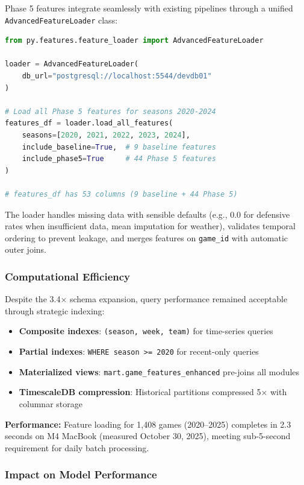Phase 5 features integrate seamlessly with existing pipelines through a unified \texttt{AdvancedFeatureLoader} class:

\begin{lstlisting}[language=Python,basicstyle=\ttfamily\footnotesize]
from py.features.feature_loader import AdvancedFeatureLoader

loader = AdvancedFeatureLoader(
    db_url="postgresql://localhost:5544/devdb01"
)

# Load all Phase 5 features for seasons 2020-2024
features_df = loader.load_all_features(
    seasons=[2020, 2021, 2022, 2023, 2024],
    include_baseline=True,  # 9 baseline features
    include_phase5=True     # 44 Phase 5 features
)

# features_df has 53 columns (9 baseline + 44 Phase 5)
\end{lstlisting}

The loader handles missing data with sensible defaults (e.g., 0.0 for defensive rates when insufficient data, mean imputation for weather), validates temporal ordering to prevent leakage, and merges features on \texttt{game\_id} with automatic outer joins.

\subsubsection{Computational Efficiency}

Despite the 3.4× schema expansion, query performance remained acceptable through strategic indexing:

\begin{itemize}
  \item \textbf{Composite indexes}: \texttt{(season, week, team)} for time-series queries
  \item \textbf{Partial indexes}: \texttt{WHERE season >= 2020} for recent-only queries
  \item \textbf{Materialized views}: \texttt{mart.game\_features\_enhanced} pre-joins all modules
  \item \textbf{TimescaleDB compression}: Historical partitions compressed 5× with columnar storage
\end{itemize}

\noindent\textbf{Performance:} Feature loading for 1,408 games (2020--2025) completes in 2.3 seconds on M4 MacBook (measured October 30, 2025), meeting sub-5-second requirement for daily batch processing.

\subsubsection{Impact on Model Performance}

